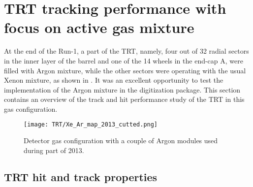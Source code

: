 \section{TRT tracking performance with focus on active gas mixture}
\label{sec:trt_tracking_perf}

At the end of the Run-1, a part of the TRT, namely,
four out of 32 radial sectors in the inner layer of the barrel and one of the 14 wheels in the end-cap A, were filled with Argon mixture, while the other sectors were operating 
with the usual Xenon mixture, as shown in .
It was an excellent opportunity to test the implementation of the Argon mixture in the digitization package.
This section contains an overview of the track and hit performance study of the TRT in this gas configuration.

\begin{figure}
\begin{center}
 \texttt{[image: TRT/Xe\_Ar\_map\_2013\_cutted.png]}
\caption{Detector gas configuration with a couple of Argon modules used during part of 2013.}
\label{fig:argonModulesIn2013}
\end{center}
\end{figure}

\subsection{TRT hit and track properties}

